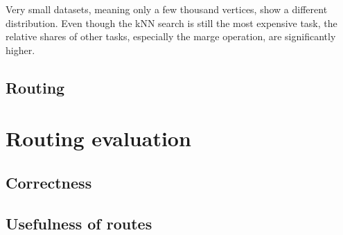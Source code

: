 		Very small datasets, meaning only a few thousand vertices, show a different distribution.
		Even though the kNN search is still the most expensive task, the relative shares of other tasks, especially the marge operation, are significantly higher.
		
	
	\subsection{Routing}
		
		
		
	
\section{Routing evaluation}

	\subsection{Correctness}
	

	\subsection{Usefulness of routes}
	
